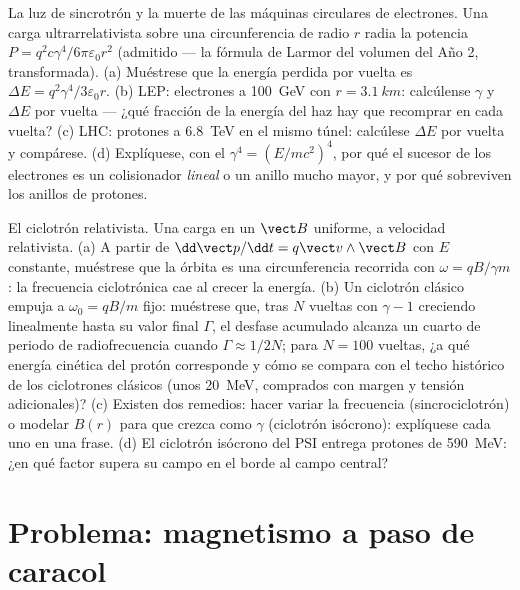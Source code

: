 \begin{exercise}[$\star\star\star$]\label{exo:b3:covariant-electromagnetism:11}
La luz de sincrotrón y la muerte de las máquinas circulares de electrones.
Una carga ultrarrelativista sobre una circunferencia de radio $r$ radia la
potencia $P = q^2c\gamma^4/6\pi\varepsilon_0r^2$ (admitido --- la fórmula de
Larmor del volumen del Año 2, transformada). (a) Muéstrese que la energía
perdida por vuelta es $\Delta E = q^2\gamma^4/3\varepsilon_0r$. (b) LEP:
electrones a \qty{100}{GeV} con $r = \qty{3.1}{km}$: calcúlense $\gamma$ y
$\Delta E$ por vuelta --- ¿qué fracción de la energía del haz hay que
recomprar en cada vuelta? (c) LHC: protones a \qty{6.8}{TeV} en el mismo
túnel: calcúlese $\Delta E$ por vuelta y compárese. (d) Explíquese, con el $\gamma^4 =
(E/mc^2)^4$, por qué el sucesor de los electrones es un
colisionador \emph{lineal} o un anillo mucho mayor, y por qué sobreviven los
anillos de protones.
\end{exercise}

\begin{exercise}[$\star\star\star$]\label{exo:b3:covariant-electromagnetism:12}
El ciclotrón relativista. Una carga en un $\vect B$ uniforme, a velocidad
relativista. (a) A partir de $\dd\vect p/\dd t = q\vect v\wedge\vect
B$ con $E$ constante, muéstrese que la órbita es una circunferencia
recorrida con $\omega = qB/\gamma m$: la frecuencia ciclotrónica cae al
crecer la energía. (b) Un ciclotrón clásico empuja a $\omega_0 = qB/m$
fijo: muéstrese que, tras $N$ vueltas con $\gamma - 1$ creciendo linealmente
hasta su valor final $\Gamma$, el desfase acumulado alcanza un cuarto de
periodo de radiofrecuencia cuando $\Gamma \approx 1/2N$; para $N = 100$
vueltas, ¿a qué energía cinética del protón corresponde y cómo se compara
con el techo histórico de los ciclotrones clásicos (unos \qty{20}{MeV},
comprados con margen y tensión adicionales)? (c) Existen dos
remedios: hacer variar la frecuencia (sincrociclotrón) o modelar $B(r)$ para
que crezca como $\gamma$ (ciclotrón isócrono): explíquese cada uno en una
frase. (d) El ciclotrón isócrono del PSI entrega protones de \qty{590}{MeV}:
¿en qué factor supera su campo en el borde al campo central?
\end{exercise}

\section{Problema: magnetismo a paso de caracol}

